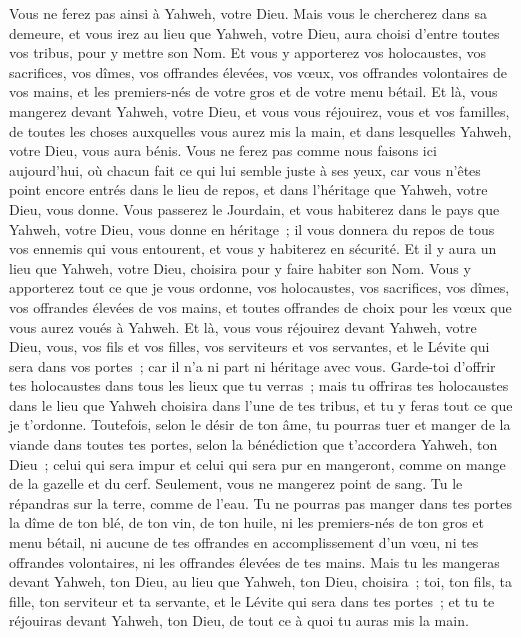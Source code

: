 \begin{multicols}{2}
Vous ne ferez pas ainsi à Yahweh, votre Dieu.
Mais vous le chercherez dans sa demeure, et vous irez au lieu que Yahweh, votre Dieu, aura choisi d'entre toutes vos tribus, pour y mettre son Nom.
Et vous y apporterez vos holocaustes, vos sacrifices, vos dîmes, vos offrandes élevées, vos vœux, vos offrandes volontaires de vos mains, et les premiers-nés de votre gros et de votre menu bétail.
Et là, vous mangerez devant Yahweh, votre Dieu, et vous vous réjouirez, vous et vos familles, de toutes les choses auxquelles vous aurez mis la main, et dans lesquelles Yahweh, votre Dieu, vous aura bénis.
Vous ne ferez pas comme nous faisons ici aujourd'hui, où chacun fait ce qui lui semble juste à ses yeux,
car vous n'êtes point encore entrés dans le lieu de repos, et dans l'héritage que Yahweh, votre Dieu, vous donne.
Vous passerez le Jourdain, et vous habiterez dans le pays que Yahweh, votre Dieu, vous donne en héritage~; il vous donnera du repos de tous vos ennemis qui vous entourent, et vous y habiterez en sécurité.
Et il y aura un lieu que Yahweh, votre Dieu, choisira pour y faire habiter son Nom. Vous y apporterez tout ce que je vous ordonne, vos holocaustes, vos sacrifices, vos dîmes, vos offrandes élevées de vos mains, et toutes offrandes de choix pour les vœux que vous aurez voués à Yahweh.
Et là, vous vous réjouirez devant Yahweh, votre Dieu, vous, vos fils et vos filles, vos serviteurs et vos servantes, et le Lévite qui sera dans vos portes~; car il n'a ni part ni héritage avec vous.
Garde-toi d'offrir tes holocaustes dans tous les lieux que tu verras~;
mais tu offriras tes holocaustes dans le lieu que Yahweh choisira dans l'une de tes tribus, et tu y feras tout ce que je t'ordonne.
Toutefois, selon le désir de ton âme, tu pourras tuer et manger de la viande dans toutes tes portes, selon la bénédiction que t'accordera Yahweh, ton Dieu~; celui qui sera impur et celui qui sera pur en mangeront, comme on mange de la gazelle et du cerf.
Seulement, vous ne mangerez point de sang. Tu le répandras sur la terre, comme de l'eau.
Tu ne pourras pas manger dans tes portes la dîme de ton blé, de ton vin, de ton huile, ni les premiers-nés de ton gros et menu bétail, ni aucune de tes offrandes en accomplissement d'un vœu, ni tes offrandes volontaires, ni les offrandes élevées de tes mains.
Mais tu les mangeras devant Yahweh, ton Dieu, au lieu que Yahweh, ton Dieu, choisira~; toi, ton fils, ta fille, ton serviteur et ta servante, et le Lévite qui sera dans tes portes~; et tu te réjouiras devant Yahweh, ton Dieu, de tout ce à quoi tu auras mis la main.

\end{multicols}
